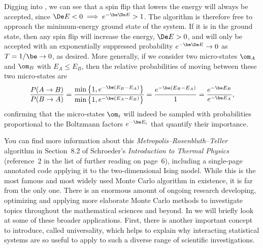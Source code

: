 Digging into , we can see that a spin flip that lowers the energy will always be accepted, since $\De E < 0 \implies e^{-\be \De E} > 1$.
The algorithm is therefore free to approach the minimum-energy ground state of the system.
If it is in the ground state, then any spin flip will increase the energy, $\De E > 0$, and will only be accepted with an exponentially suppressed probability $e^{-\be \De E} \to 0$ as $T = 1 / \be \to 0$, as desired.
More generally, if we consider two micro-states $\om_A$ and $\om_B$ with $E_A \leq E_B$, then the relative probabilities of moving between these two micro-states are
\begin{equation*}
  \frac{P(A \to B)}{P(B \to A)} = \frac{\mbox{min}\left\{1, e^{-\be(E_B - E_A)}\right\}}{\mbox{min}\left\{1, e^{-\be(E_A - E_B)}\right\}} = \frac{e^{-\be(E_B - E_A)}}{1} = \frac{e^{-\be E_B}}{e^{-\be E_A}},
\end{equation*}
confirming that the micro-states $\om_i$ will indeed be sampled with probabilities proportional to the Boltzmann factors $e^{-\be E_i}$ that quantify their importance.

You can find more information about this \textit{Metropolis--Rosenbluth--Teller} algorithm in Section~8.2 of Schroeder's \textit{Introduction to Thermal Physics} (reference~2 in the list of further reading on page~6), including a single-page annotated code applying it to the two-dimensional Ising model.
While this is the most famous and most widely used Monte Carlo algorithm in existence, it is far from the only one.
There is an enormous amount of ongoing research developing, optimizing and applying more elaborate Monte Carlo methods to investigate topics throughout the mathematical sciences and beyond.
In  we will briefly look at some of these broader applications.
First, there is another important concept to introduce, called universality, which helps to explain why interacting statistical systems are so useful to apply to such a diverse range of scientific investigations.



